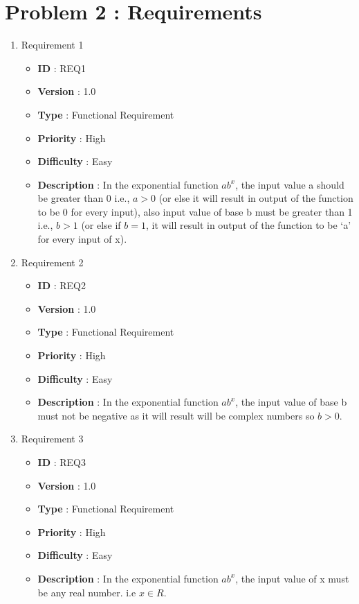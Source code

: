 \documentclass[12pt, a4paper]{article}
\begin{document}
\section{Problem 2 : Requirements}
\begin{enumerate}
    \item{} Requirement 1
        \begin{itemize}
        \item \textbf{ID} : REQ1
        \item \textbf{Version} : 1.0
        \item \textbf{Type} : Functional Requirement
        \item \textbf{Priority} : High
        \item \textbf{Difficulty} : Easy
        \item \textbf{Description} : In the exponential function $ ab^x $, the input value a should be greater than 0 i.e., $ a > 0 $ (or else it will result in output of the function to be 0 for every input), also input value of base b must be greater than 1 i.e., $ b > 1 $ (or else if $b = 1 $, it will result in output of the function to be ‘a’ for every input of x).
        \end{itemize}
    
    \item{} Requirement 2
        \begin{itemize}
        \item \textbf{ID} : REQ2
        \item \textbf{Version} : 1.0
        \item \textbf{Type} : Functional Requirement
        \item \textbf{Priority} : High
        \item \textbf{Difficulty} : Easy
        \item \textbf{Description} : In the exponential function $ab^x$, the input value of base b must not be negative as it will result will be complex numbers so $b > 0$.
        \end{itemize}
    
    \item{} Requirement 3
        \begin{itemize}
        \item \textbf{ID} : REQ3
        \item \textbf{Version} : 1.0
        \item \textbf{Type} : Functional Requirement
        \item \textbf{Priority} : High
        \item \textbf{Difficulty} : Easy
        \item \textbf{Description} : In the exponential function $ab^x$, the input value of x must be any real number. i.e $x \in R$.
        \end{itemize}
    

\end{enumerate}
\end{document}
